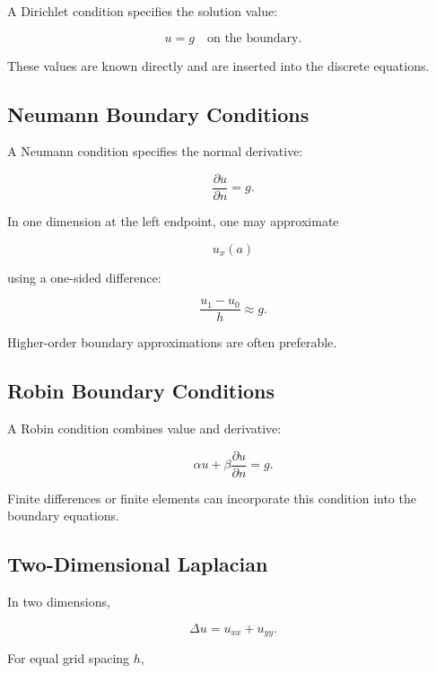 A Dirichlet condition specifies the solution value:

\[
\boxed{
u=g
\quad
\text{on the boundary}.
}
\]

These values are known directly and are inserted into the discrete
equations.

\subsection{Neumann Boundary Conditions}
\label{subsec:neumann-boundary-numerical}

A Neumann condition specifies the normal derivative:

\[
\boxed{
\frac{\partial u}{\partial n}
=
g.
}
\]

In one dimension at the left endpoint, one may approximate

\[
u_x(a)
\]

using a one-sided difference:

\[
\boxed{
\frac{
u_1-u_0
}{
h
}
\approx
g.
}
\]

Higher-order boundary approximations are often preferable.

\subsection{Robin Boundary Conditions}
\label{subsec:robin-boundary-numerical}

A Robin condition combines value and derivative:

\[
\boxed{
\alpha u
+
\beta
\frac{\partial u}{\partial n}
=
g.
}
\]

Finite differences or finite elements can incorporate this condition into
the boundary equations.

\subsection{Two-Dimensional Laplacian}
\label{subsec:two-dimensional-laplacian}

In two dimensions,

\[
\boxed{
\Delta u
=
u_{xx}+u_{yy}.
}
\]

For equal grid spacing \(h\),


